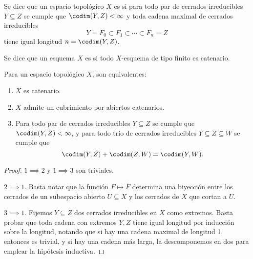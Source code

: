 \begin{mydef}
	Se dice que un espacio topológico $X$ es 
	si para todo par de cerrados irreducibles $Y \subseteq Z$ se cumple que $\codim(Y, Z) < \infty$ y toda cadena maximal de cerrados irreducibles
	$$ Y = F_0 \subset F_1 \subset \cdots \subset F_n = Z $$
	tiene igual longitud $n = \codim(Y, Z)$.

	Se dice que un esquema $X$ es  si todo $X$-esquema de tipo finito es catenario.
\end{mydef}
\begin{prop}
	Para un espacio topológico $X$, son equivalentes:
	\begin{enumerate}
		\item $X$ es catenario.
		\item $X$ admite un cubrimiento por abiertos catenarios.
		\item Para todo par de cerrados irreducibles $Y \subseteq Z$ se cumple que $\codim(Y, Z) < \infty$,
			y para todo trío de cerrados irreducibles $Y \subseteq Z \subseteq W$ se cumple que
			$$ \codim(Y, Z) + \codim(Z, W) = \codim(Y, W). $$
	\end{enumerate}
\end{prop}
\begin{proof}
	$1 \implies 2$ y $1 \implies 3$ son triviales.

	$2 \implies 1$. Basta notar que la función $F \mapsto \overline{F}$ determina una biyección entre los cerrados de un subespacio abierto $U \subseteq X$
	y los cerrados de $X$ que cortan a $U$.

	$3 \implies 1$. Fijemos $Y \subseteq Z$ dos cerrados irreducibles en $X$ como extremos.
	Basta probar que toda cadena con extremos $Y, Z$ tiene igual longitud por inducción sobre la longitud, notando que si hay una cadena maximal de longitud 1,
	entonces es trivial, y si hay una cadena más larga, la descomponemos en dos para emplear la hipótesis inductiva.
\end{proof}
